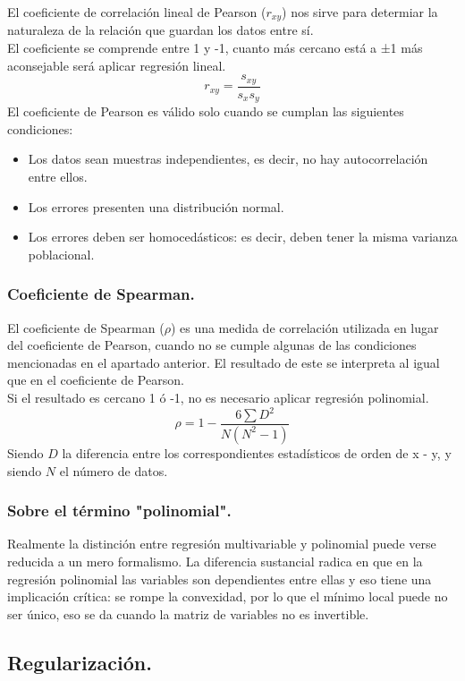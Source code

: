 \documentclass[a4paper,10pt]{article}
\begin{document}
El coeficiente de correlación lineal de Pearson ($r_{xy}$) nos sirve para determiar la naturaleza de la relación que guardan los datos entre sí. \\El coeficiente se comprende entre 1 y -1, cuanto más cercano está a ±1 más aconsejable será aplicar regresión lineal.
\[
r_{xy}=\frac{s_{xy}}{s_x s_y}
\]
El coeficiente de Pearson es válido solo cuando se cumplan las siguientes condiciones:
\begin{itemize}
    \item Los datos sean muestras independientes, es decir, no hay autocorrelación entre ellos.
    \item Los errores presenten una distribución normal.
    \item Los errores deben ser homocedásticos: es decir, deben tener la misma
varianza poblacional.
\end{itemize}
\subsubsection{Coeficiente de Spearman.}

El coeficiente de Spearman ($\rho$) es una medida de correlación utilizada en lugar del coeficiente de Pearson, cuando no se cumple algunas de las condiciones mencionadas en el apartado anterior. El resultado de este se interpreta al igual que en el coeficiente de Pearson. \\Si el resultado es cercano 1 ó -1, no es necesario aplicar regresión polinomial.
\[
\rho = 1 - \frac{6\sum D^2}{N(N^2 - 1)}
\]
Siendo $D$  la diferencia entre los correspondientes estadísticos de orden de x - y, y siendo $N$ el número de datos.

\subsubsection{Sobre el término "polinomial".}

\indent
Realmente la distinción entre regresión multivariable y polinomial puede verse reducida a un mero formalismo. La diferencia sustancial radica en que en la regresión polinomial las variables son dependientes entre ellas y eso tiene una implicación crítica: se rompe la convexidad, por lo que el mínimo local puede no ser único, eso se da cuando la matriz de variables no es invertible.
\subsection{Regularización.}
\end{document}
